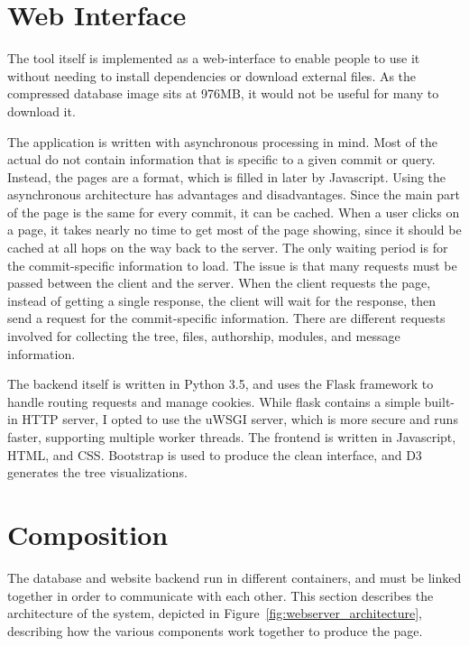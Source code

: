 \section{Web Interface}\label{sec:web_interface}

The tool itself is implemented as a web-interface to enable people to
use it without needing to install dependencies or download external
files. As the compressed database image sits at 976MB, it would not be
useful for many to download it.

The application is written with asynchronous processing in mind. Most of
the actual do not contain information that is specific to a given commit
or query. Instead, the pages are a format, which is filled in later by
Javascript. Using the asynchronous architecture has advantages and
disadvantages. Since the main part of the page is the same for every
commit, it can be cached. When a user clicks on a page, it takes nearly
no time to get most of the page showing, since it should be cached at
all hops on the way back to the server. The only waiting period is for
the commit-specific information to load. The issue is that many requests
must be passed between the client and the server. When the client
requests the page, instead of getting a single response, the client will
wait for the response, then send a request for the commit-specific
information. There are different requests involved for collecting the
tree, files, authorship, modules, and message information.

The backend itself is written in Python 3.5, and uses the Flask
framework to handle routing requests and manage cookies. While flask
contains a simple built-in HTTP server, I opted to use the uWSGI server,
which is more secure and runs faster, supporting multiple worker
threads. The frontend is written in Javascript, HTML, and CSS. Bootstrap
is used to produce the clean interface, and D3 generates the tree
visualizations.

\section{Composition}\label{sec:composition}

The database and website backend run in different containers, and must
be linked together in order to communicate with each other. This section
describes the architecture of the system, depicted in
Figure~\ref{fig:webserver_architecture}, describing how the various
components work together to produce the page.

